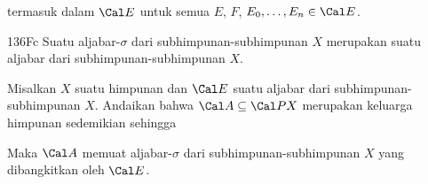 

\noindent termasuk dalam $\Cal E$ untuk semua $E$, $F$,
$E_0,\ldots,E_n\in\Cal E$. 

\spheader 136Fc Suatu aljabar-$\sigma$ dari subhimpunan-subhimpunan $X$
 merupakan suatu aljabar dari subhimpunan-subhimpunan $X$.

 Misalkan $X$ suatu himpunan dan $\Cal E$ suatu
aljabar dari subhimpunan-subhimpunan $X$. Andaikan bahwa
$\Cal A\subseteq\Cal PX$ merupakan keluarga himpunan sedemikian sehingga


\noindent Maka $\Cal A$ memuat aljabar-$\sigma$ dari subhimpunan-subhimpunan
$X$ yang dibangkitkan oleh $\Cal E$.

